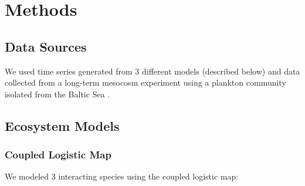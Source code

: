 \section{Methods}

\subsection{Data Sources}

We used time series generated from 3 different models (described below) and data collected from a long-term mesocosm experiment using a plankton community isolated from the Baltic Sea \cite{Hastings_1991, Dennis_2001, Heerkloss_1998, Beninca_2009}.

\subsection{Ecosystem Models}

\subsubsection{Coupled Logistic Map}

We modeled 3 interacting species using the coupled logistic map:

